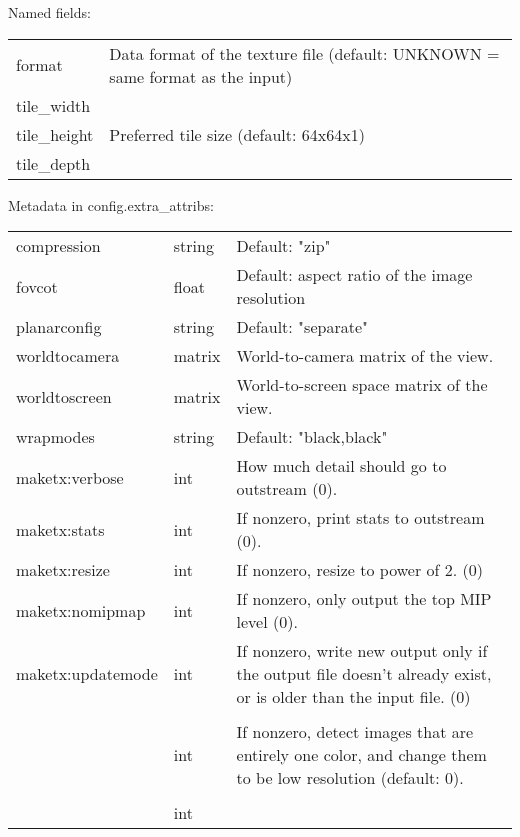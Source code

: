 \noindent Named fields:

\begin{tabular}{ >{\cf}l p{4in}}
   format         & Data format of the texture file (default: UNKNOWN =
                    same format as the input) \\
   tile_width     & \multirow{3}{*}{Preferred tile size (default: 64x64x1)} \\
   tile_height    &       \\
   tile_depth     & \\
\end{tabular}
\medskip

\noindent Metadata in {\cf config.extra_attribs}:

\begin{longtable}{ >{\spc \cf\small}p{1.8in} >{\cf\small}l p{3in}}
   compression & string &   Default: "zip" \\
   fovcot & float &          Default: aspect ratio of the image resolution \\
   planarconfig & string &  Default: "separate" \\
   worldtocamera & matrix &  World-to-camera matrix of the view. \\
   worldtoscreen & matrix &  World-to-screen space matrix of the view. \\
   wrapmodes & string &     Default: "black,black" \\
   maketx:verbose & int &    How much detail should go to outstream (0). \\
   maketx:stats & int &      If nonzero, print stats to outstream (0). \\
   maketx:resize & int &     If nonzero, resize to power of 2. (0) \\
   maketx:nomipmap & int &   If nonzero, only output the top MIP level (0). \\
   maketx:updatemode & int &  If nonzero, write new output only if the
                             output file doesn't already exist, or is
                             older than the input file. (0) \\
   \multicolumn{2}{l}{\spc \cf\small maketx:constant_color_detect} \\  & int &
                          If nonzero, detect images that are entirely
                            one color, and change them to be low
                            resolution (default: 0). \\
   \multicolumn{2}{l}{\spc \cf\small maketx:monochrome_detect} \\ & int &

\end{longtable}
